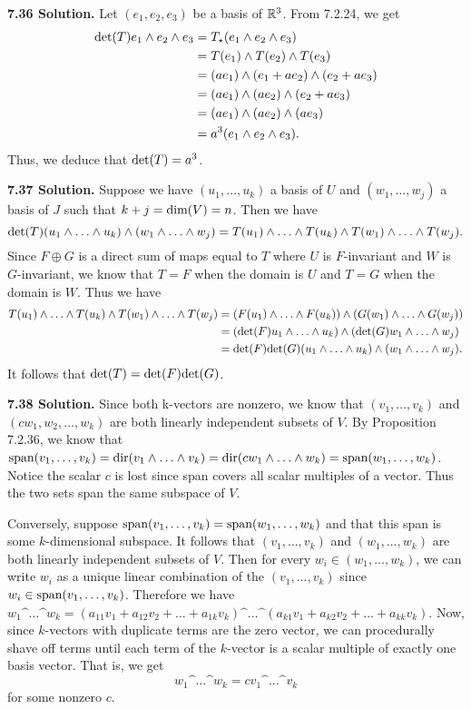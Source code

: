 \textbf{7.36 Solution.} Let $(e_1, e_2, e_3)$ be a basis of $\mathbb{R}^3$. From 7.2.24, we get
\begin{align*}
    \text{det}(T)e_1 \wedge e_2 \wedge e_3 &= T_\star(e_1 \wedge e_2 \wedge e_3) \\
    &= T(e_1) \wedge T(e_2) \wedge T(e_3) \\
    &= (ae_1) \wedge (e_1 + ae_2) \wedge (e_2 + ae_3) \\
    &= (ae_1) \wedge (ae_2) \wedge (e_2 + ae_3) \\
    &= (ae_1) \wedge (ae_2) \wedge (ae_3) \\
    &= a^3(e_1 \wedge e_2 \wedge e_3).
\end{align*}
Thus, we deduce that $\text{det}(T) = a^3$.

\textbf{7.37 Solution.} Suppose we have $(u_1, \dots, u_k)$ a basis of $U$ and $(w_1, \dots, w_j)$ a basis of $J$ such that $k + j = \text{dim}(V) = n$. Then we have
\[
\f{det}(T)(u_1 \^ \dots \^ u_k) \^ (w_1 \^ \dots \^ w_j) = T(u_1) \^ \dots \^ T(u_k) \^ T(w_1) \^ \dots \^ T(w_j).
\]
Since $F \oplus G$ is a direct sum of maps equal to $T$ where $U$ is $F$-invariant and $W$ is $G$-invariant, we know that $T = F$ when the domain is $U$ and $T = G$ when the domain is $W$. Thus we have
\begin{align*}
T(u_1) \^ \dots \^ T(u_k) \^ T(w_1) \^ \dots \^ T(w_j) &= (F(u_1) \^ \dots \^ F(u_k)) \^ (G(w_1) \^ \dots \^ G(w_j)) \\
&= (\f{det}(F)u_1 \^ \dots \^ u_k) \^ (\f{det}(G)w_1 \^ \dots \^ w_j) \\
&= \f{det}(F)\f{det}(G)(u_1 \^ \dots \^ u_k) \^ (w_1 \^ \dots \^ w_j).
\end{align*}
It follows that $\text{det}(T) = \text{det}(F)\text{det}(G)$.

\textbf{7.38 Solution.} Since both k-vectors are nonzero, we know that $(v_1, \dots, v_k)$ and $(cw_1, w_2, \dots, w_k)$ are both linearly independent subsets of $V$. By Proposition 7.2.36, we know that $\f{span}(v_1, \dots, v_k) = \f{dir}(v_1 \^ \dots \^ v_k) = \f{dir}(cw_1 \^ \dots \^ w_k) = \f{span}(w_1, \dots, w_k)$. Notice the scalar $c$ is lost since span covers all scalar multiples of a vector. Thus the two sets span the same subspace of $V$.

Conversely, suppose $\text{span}(v_1, \dots, v_k) = \text{span}(w_1, \dots, w_k)$ and that this span is some $k$-dimensional subspace. It follows that $(v_1, \dots, v_k)$ and $(w_1, \dots, w_k)$ are both linearly independent subsets of $V$. Then for every $w_i \in (w_1, \dots, w_k)$, we can write $w_i$ as a unique linear combination of the $(v_1, \dots, v_k)$ since $w_i \in \text{span}(v_1, \dots, v_k)$. Therefore we have $w_1 \^ \dots \^ w_k = (a_{11}v_1 + a_{12}v_2 + \dots + a_{1k}v_k) \^ \dots \^ (a_{k1}v_1 + a_{k2}v_2 + \dots + a_{kk}v_k)$. Now, since $k$-vectors with duplicate terms are the zero vector, we can procedurally shave off terms until each term of the $k$-vector is a scalar multiple of exactly one basis vector. That is, we get
\[
w_1 \^ \dots \^ w_k = cv_1 \^ \dots \^ v_k
\]
for some nonzero $c$.

